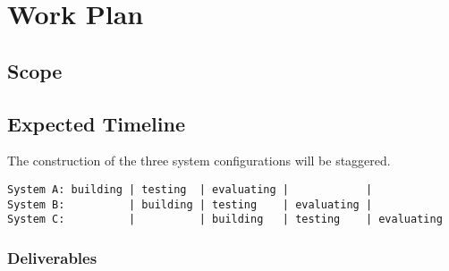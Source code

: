 
\newpage
\section{Work Plan}

\subsection{Scope}

\subsection{Expected Timeline}
The construction of the three system configurations will be staggered.
\begin{verbatim}
System A: building | testing  | evaluating |            |    
System B:          | building | testing    | evaluating |
System C:          |          | building   | testing    | evaluating
\end{verbatim}


\subsubsection{Deliverables}

